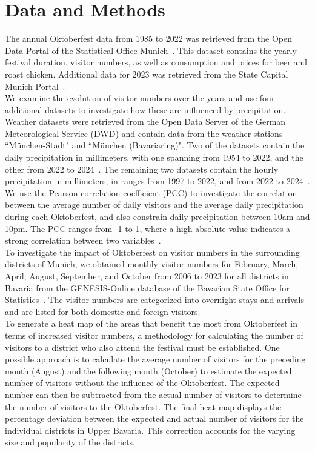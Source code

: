 \documentclass{article}
\theoremstyle{plain}
\theoremstyle{definition}
\theoremstyle{remark}
\begin{document}
\section{Data and Methods}\label{sec:methods}
The annual Oktoberfest data from 1985 to 2022 was retrieved from the Open Data Portal of the Statistical Office Munich~\citep{5}. This dataset contains the yearly festival duration, visitor numbers, as well as consumption and prices for beer and roast chicken. Additional data for 2023 was retrieved from the State Capital Munich Portal~\citep{6,7}. \\
We examine the evolution of visitor numbers over the years and use four additional datasets to investigate how these are influenced by precipitation. Weather datasets were retrieved from the Open Data Server of the German Meteorological Service (DWD) and contain data from the weather stations ``München-Stadt" and ``München (Bavariaring)". Two of the datasets contain the daily precipitation in millimeters, with one spanning from 1954 to 2022, and the other from 2022 to 2024~\citep{3,4}. The remaining two datasets contain the hourly precipitation in millimeters, in ranges from 1997 to 2022, and from 2022 to 2024~\citep{1,2}. We use the Pearson correlation coefficient (PCC) to investigate the correlation between the average number of daily visitors and the average daily precipitation during each Oktoberfest, and also constrain daily precipitation between 10am and 10pm. The PCC ranges from -1 to 1, where a high absolute value indicates a strong correlation between two variables~\cite{thonield}.\\
To investigate the impact of Oktoberfest on visitor numbers in the surrounding districts of Munich, we obtained monthly visitor numbers for February, March, April, August, September, and October from 2006 to 2023 for all districts in Bavaria from the GENESIS-Online database of the Bavarian State Office for Statistics~\citep{table_GENESIS}. The visitor numbers are categorized into overnight stays and arrivals and are listed for both domestic and foreign visitors.\\
To generate a heat map of the areas that benefit the most from Oktoberfest in terms of increased visitor numbers, a methodology for calculating the number of visitors to a district who also attend the festival must be established. One possible approach is to calculate the average number of visitors for the preceding month (August) and the following month (October) to estimate the expected number of visitors without the influence of the Oktoberfest. The expected number can then be subtracted from the actual number of visitors to determine the number of visitors to the Oktoberfest. The final heat map displays the percentage deviation between the expected and actual number of visitors for the individual districts in Upper Bavaria. This correction accounts for the varying size and popularity of the districts.\\
\end{document}
